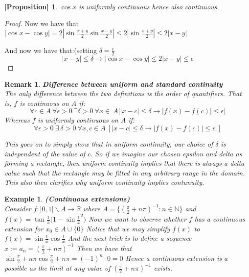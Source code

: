 \documentclass[titlepage]{article}
\newtheorem{remark}{Remark}[section]
\newtheorem{prop}{[Proposition]}
\newtheorem{example}{Example}[section]
\begin{document}
\begin{prop}
$\cos{x}$ is uniformly continuous hence also continuous.
\end{prop}

\begin{proof}
Now we have that $|\cos{x} - \cos{y}|=2|\sin{\frac{x+y}{2}}\sin{\frac{x-y}{2}}| \leq 2|\sin{\frac{x+y}{2}}|\leq 2|x-y|$

And now we have that:(setting $\delta = \frac{\epsilon}{2}$
$$|x-y|\leq \delta \rightarrow |\cos{x} - \cos{y}|\leq  2|x-y|\leq \epsilon$$
\end{proof}


\begin{remark}\textbf{Difference between uniform and standard continuity}
\\
The only difference between the two definitions is the order of quantifiers. That is, $f$ is continuous on $A$ if:
$$\forall c \in A \ \forall \epsilon > 0 \ \exists \delta > 0 \ \forall x \in \ A[ |x-c| \leq \delta \rightarrow |f(x) - f(c)|\leq \epsilon|$$ Whereas $f$ is uniformly continuous on $A$ if: 
$$\forall \epsilon > 0 \ \exists \ \delta > 0 \ \forall x,c \in A \ [|x-c| \leq \delta \rightarrow |f(x) - f(c)|\leq \epsilon|]$$

This goes on to simply show that in uniform continuity, our choice of $\delta$ is independent of the value of $c$. So if we imagine our chosen epsilon and delta as forming a rectangle, then uniform continuity implies that there is always a delta value such that the rectangle may be fitted in any arbitrary range in the domain. This also then clarifies why uniform continuity implies contunuity. 
\end{remark}

\begin{example}\textbf{(Continuous extensions)}
\\
Consider $f:]0,1]\backslash A \to \mathbb{R}$ where $A = \{(\frac{\pi}{2} + n\pi)^{-1} : n\in \mathbb{N} \}$ and $f(x) = \tan{\frac{1}{x}}(1-\sin{\frac{1}{x}^2)} $ Now we want to observe whether $f$ has a continuous extension for $x_{0} \in A \cup \{0\}$ Notice that we may simplify $f(x)$ to $f(x) = \sin{\frac{1}{x}}\cos{\frac{1}{x}}$ And the next trick is to define a sequence $ x:= a_{n} = (\frac{\pi}{2} + n\pi)^{-1} $ Then we have that $\sin{\frac{\pi}{2} + n\pi}\cos{\frac{\pi}{2} + n\pi} = (-1)^{n}\cdot 0 = 0$ Hence a continuous extension is a possible as the limit at any value of $(\frac{\pi}{2} + n\pi)^{-1}$ exists. 
\end{example}
\end{document}
